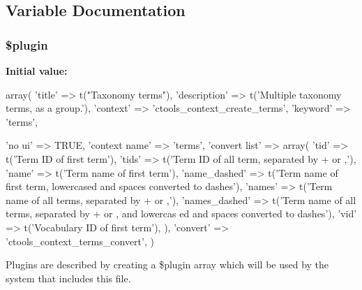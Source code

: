 \subsection{Variable Documentation}
\hypertarget{contexts_2terms_8inc_ada8a7130088351710bb02ed622d6bf65}{
\subsubsection[{\$plugin}]{\setlength{\rightskip}{0pt plus 5cm}\$plugin}}
\label{contexts_2terms_8inc_ada8a7130088351710bb02ed622d6bf65}
{\bfseries Initial value:}
\begin{DoxyCode}
 array(
  'title' => t("Taxonomy terms"),
  'description' => t('Multiple taxonomy terms, as a group.'),
  'context' => 'ctools_context_create_terms',
  'keyword' => 'terms',
  
  'no ui' => TRUE,
  'context name' => 'terms',
  'convert list' => array(
    'tid' => t('Term ID of first term'),
    'tids' => t('Term ID of all term, separated by + or ,'),
    'name' => t('Term name of first term'),
    'name_dashed' => t('Term name of first term, lowercased and spaces converted 
      to dashes'),
    'names' => t('Term name of all terms, separated by + or ,'),
    'names_dashed' => t('Term name of all terms, separated by + or , and lowercas
      ed and spaces converted to dashes'),
    'vid' => t('Vocabulary ID of first term'),
  ),
  'convert' => 'ctools_context_terms_convert',
)
\end{DoxyCode}
Plugins are described by creating a \$plugin array which will be used by the system that includes this file. 
